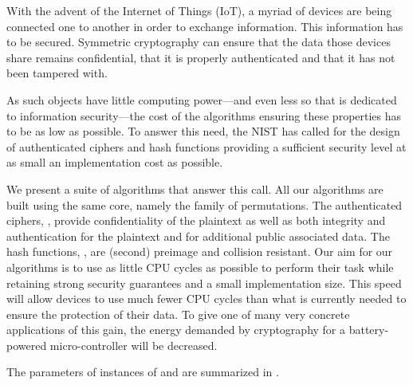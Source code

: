 
With the advent of the Internet of Things (IoT), a myriad of devices are being connected one to another in order to exchange information. This information has to be secured. Symmetric cryptography can ensure that the data those devices share remains confidential, that it is properly authenticated and that it has not been tampered with.

As such objects have little computing power---and even less so that is dedicated to information security---the cost of the algorithms ensuring these properties has to be as low as possible. To answer this need, the NIST has called for the design of authenticated ciphers and hash functions providing a sufficient security level at as small an implementation cost as possible.

We present a suite of algorithms that answer this call. All our algorithms are built using the same core, namely the \aCipher{} family of permutations. The authenticated ciphers, \aead{}, provide confidentiality of the plaintext as well as both integrity and authentication for the plaintext and for additional public associated data. The hash functions, \hash{}, are (second) preimage and collision resistant. Our aim for our algorithms is to use as little CPU cycles as possible to perform their task while retaining strong security guarantees and a small implementation size. This speed will allow devices to use much fewer CPU cycles than what is currently needed to ensure the protection of their data. To give one of many very concrete applications of this gain, the energy demanded by cryptography for a battery-powered micro-controller will be decreased.

The parameters of instances of \hash{} and \aead{} are summarized in .

\begin{table}
\end{table}

